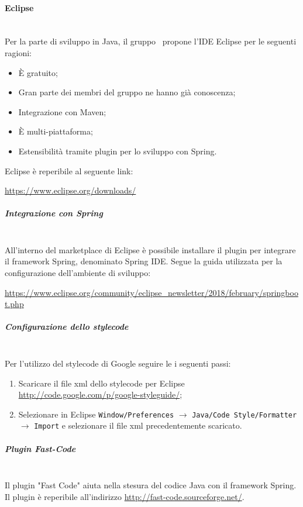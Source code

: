 \paragraph{Eclipse}\mbox{}\\
Per la parte di sviluppo in Java, il gruppo \gruppo \ propone l'IDE Eclipse per le seguenti ragioni:
\begin{itemize}
	\item \`E gratuito;
	\item Gran parte dei membri del gruppo ne hanno già conoscenza;
	\item Integrazione con Maven;
	\item \`E multi-piattaforma;
	\item Estensibilità tramite plugin per lo sviluppo con Spring.
\end{itemize}
Eclipse è reperibile al seguente link:\newline
\begin{center}
	\url{https://www.eclipse.org/downloads/}
\end{center}
\subparagraph{Integrazione con Spring} \mbox{}\\
All'interno del marketplace di Eclipse è possibile installare il plugin per integrare il framework Spring, denominato Spring IDE.
Segue la guida utilizzata per la configurazione dell'ambiente di sviluppo: \\
\begin{center}
\url{https://www.eclipse.org/community/eclipse_newsletter/2018/february/springboot.php}
\end{center}
\subparagraph{Configurazione dello stylecode}\mbox{}\\
Per l'utilizzo del stylecode di Google seguire le i seguenti passi:
\begin{enumerate}
\item Scaricare il file xml dello stylecode per Eclipse\\
	\url{http://code.google.com/p/google-styleguide/};
\item Selezionare in Eclipse \texttt{Window/Preferences} $\rightarrow$ \texttt{Java/Code Style/Formatter} $\rightarrow$ \texttt{Import} e selezionare il file xml precedentemente scaricato.
\end{enumerate}

\subparagraph{Plugin Fast-Code}\mbox{}\\
Il plugin "Fast Code" aiuta nella stesura del codice Java con il framework Spring. Il plugin è reperibile all'indirizzo \url{http://fast-code.sourceforge.net/}. 


